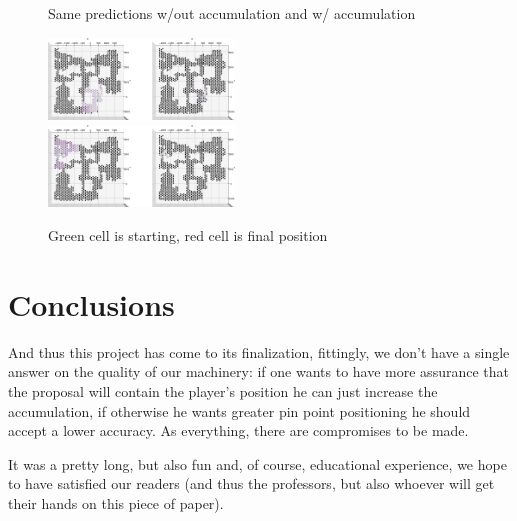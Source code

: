 \documentclass[9pt, a4paper]{IEEEtran}
\begin{document}
    \begin{figure}[h]
        \caption{Same predictions w/out accumulation and w/ accumulation}
        \centering
        \includegraphics[width=0.44\textwidth]{images/wildfire_v_non.png}\\
        \includegraphics[width=0.44\textwidth]{images/wildfire_v_non2.png}
        \caption*{Green cell is starting, red cell is final position}
    \end{figure}

    \section{Conclusions}
    And thus this project has come to its finalization, fittingly, we don't have a single answer on the quality of our machinery: if one wants to have more assurance that the proposal will contain the player's position he can just increase the accumulation, if otherwise he wants greater pin point positioning he should accept a lower accuracy. As everything, there are compromises to be made.

    It was a pretty long, but also fun and, of course, educational experience, we hope to have satisfied our readers (and thus the professors, but also whoever will get their hands on this piece of paper).
\end{document}
